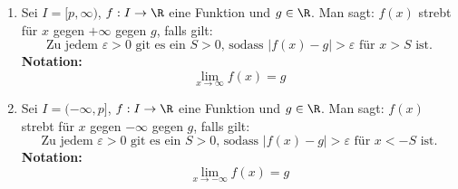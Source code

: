 \begin{enumerate}[leftmargin=*]
    \item Sei $I = [p, \infty)$, $f: I \to \R$ eine Funktion und $g \in \R$. Man sagt: $f(x)$ strebt für $x$ gegen $+\infty$ gegen $g$, falls gilt:
    $$\text{Zu jedem $\varepsilon > 0$ git es ein $S > 0$, sodass $|f(x)-g| > \varepsilon$ für $x > S$ ist.}$$
    \textbf{Notation:} $$\lim_{x \to \infty} f(x) = g$$
    \item Sei $I = (-\infty, p]$, $f: I \to \R$ eine Funktion und $g \in \R$. Man sagt: $f(x)$ strebt für $x$ gegen $-\infty$ gegen $g$, falls gilt:
    $$\text{Zu jedem $\varepsilon > 0$ git es ein $S > 0$, sodass $|f(x)-g| > \varepsilon$ für $x < -S$ ist.}$$
    \textbf{Notation:} $$\lim_{x \to -\infty} f(x) = g$$
\end{enumerate}